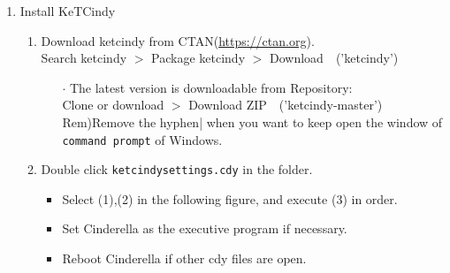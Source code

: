 \documentclass{article}
\begin{document}
\begin{enumerate}[\bf\large 1.]
\item Install KeTCindy
  \begin{enumerate}[(1)]
  \item Download ketcindy from CTAN(\url{https://ctan.org}).\\
  \hspace*{10mm}Search ketcindy $>$ Pack­age ketcindy $>$ Download\ \ ('ketcindy')
    \begin{itemize}
    \item[$\cdot$]The latest version is downloadable from Repository:\\
         \hspace*{10mm}Clone or download $>$ Download ZIP\ \ ('ketcindy-master')\\
        \hspace*{5mm}Rem)Remove the hyphen| when you want to keep open the window of \verb|command prompt| of Windows.
    \end{itemize}
  \item Double click \verb|ketcindysettings.cdy| in the folder.
    \begin{itemize}
   \item  Select (1),(2) in the following figure, and execute (3) in order.
    \item Set Cinderella as the executive program if necessary.
    \item Reboot Cinderella if other cdy files are open.
   \end{itemize}
  \end{enumerate}



\end{enumerate}
\end{document}
